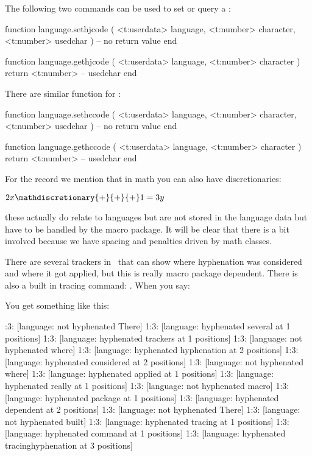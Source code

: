 The following two commands can be used to set or query a \type {\hjcode}:

\starttyping [option=LUA]
function language.sethjcode (
    <t:userdata> language,
    <t:number>   character,
    <t:number>   usedchar
)
    -- no return value
end

function language.gethjcode (
    <t:userdata> language,
    <t:number>   character
)
    return <t:number> -- usedchar
end
\stoptyping

There are similar function for \type {\hccode}:

\starttyping [option=LUA]
function language.sethccode (
    <t:userdata> language,
    <t:number>   character,
    <t:number>   usedchar
)
    -- no return value
end

function language.gethccode (
    <t:userdata> language,
    <t:number>   character
)
    return <t:number> -- usedchar
end
\stoptyping

\stopsection

\startsection[title=Math]

For the record we mention that in math you can also have discretionaries:

\starttyping
$ 2x \mathdiscretionary{+}{+}{+} 1 = 3y $
\stoptyping

these actually do relate to languages but are not stored in the language data but
have to be handled by the macro package. It will be clear that there is a bit
involved because we have spacing and penalties driven by math classes.

\stopsection

\startsection[title=Tracing]

There are several trackers in \CONTEXT\ that can show where hyphenation was considered and
where it got applied, but this is really macro package dependent. There is also a built in
tracing command: \typ {\tracinghyphenation}. When you say:

\starttyping
{}
\stoptyping

You get something like this:

:3: [language: not hyphenated There]
1:3: [language: hyphenated several at 1 positions]
1:3: [language: hyphenated trackers at 1 positions]
1:3: [language: not hyphenated where]
1:3: [language: hyphenated hyphenation at 2 positions]
1:3: [language: hyphenated considered at 2 positions]
1:3: [language: not hyphenated where]
1:3: [language: hyphenated applied at 1 positions]
1:3: [language: hyphenated really at 1 positions]
1:3: [language: not hyphenated macro]
1:3: [language: hyphenated package at 1 positions]
1:3: [language: hyphenated dependent at 2 positions]
1:3: [language: not hyphenated There]
1:3: [language: not hyphenated built]
1:3: [language: hyphenated tracing at 1 positions]
1:3: [language: hyphenated command at 1 positions]
1:3: [language: hyphenated tracinghyphenation at 3 positions]
\stoptyping

